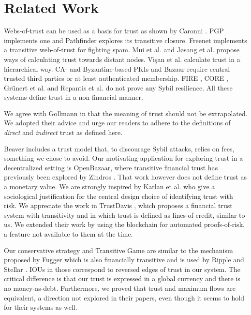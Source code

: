 \section{Related Work}
  Webs-of-trust can be used as a basis for trust as shown by Caronni \cite{wot}. PGP \cite{pgp} implements one and Pathfinder
  \cite{pathfinder} explores its transitive closure. Freenet \cite{freenet} implements a transitive web-of-trust for fighting
  spam. Mui et al. \cite{mui} and J\o{}sang et al. \cite{beta} propose ways of calculating trust towards distant nodes.
  Vi\c{s}an et al. \cite{vpc} calculate trust in a hierarchical way. CA- and Byzantine-based \cite{byzantine} PKIs \cite{pki}
  and Bazaar \cite{bazaar} require central trusted third parties or at least authenticated membership. FIRE \cite{fire}, CORE
  \cite{core}, Gr\"unert et al. \cite{ghkkw} and Repantis et al. \cite{rk} do not prove any Sybil resilience. All these
  systems define trust in a non-financial manner.

  We agree with Gollmann \cite{badtrust} in that the meaning of trust should not be extrapolated. We adopted their advice and
  urge our readers to adhere to the definitions of \textit{direct} and \textit{indirect} trust as defined here.

  Beaver \cite{beaver} includes a trust model that, to discourage Sybil attacks, relies on fees, something we chose to avoid.
  Our motivating application for exploring trust in a decentralized setting is OpenBazaar, where transitive financial trust
  has previously been explored by Zindros \cite{dionyziz}. That work however does not define trust as a monetary value. We are
  strongly inspired by Karlan et al. \cite{kmrs} who give a sociological justification for the central design choice of
  identifying trust with risk. We appreciate the work in TrustDavis \cite{davis}, which proposes a financial trust system with
  transitivity and in which trust is defined as lines-of-credit, similar to us. We extended their work by using the blockchain
  for automated proofs-of-risk, a feature not available to them at the time.

  Our conservative strategy and Transitive Game are similar to the mechanism proposed by Fugger \cite{iou} which is also
  financially transitive and is used by Ripple \cite{ripple} and Stellar \cite{stellar}. IOUs in those correspond to reversed
  edges of trust in our system. The critical difference is that our trust is expressed in a global currency and there is no
  money-as-debt. Furthermore, we proved that trust and maximum flows are equivalent, a direction not explored in their papers,
  even though it seems to hold for their systems as well.
